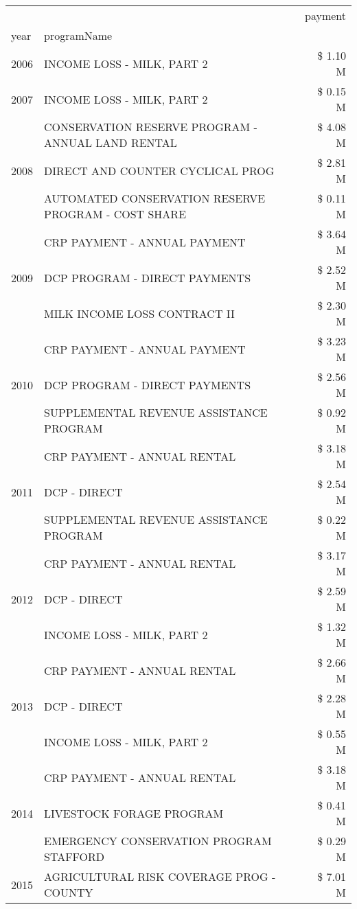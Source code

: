 \begin{tabular}{llr}
\toprule
 &  & payment \\
year & programName &  \\
\midrule
2006 & INCOME LOSS - MILK, PART 2 & \$ 1.10 M \\
\cline{1-3}
2007 & INCOME LOSS - MILK, PART 2 & \$ 0.15 M \\
\cline{1-3}
\multirow[t]{3}{*}{2008} & CONSERVATION RESERVE PROGRAM - ANNUAL LAND RENTAL & \$ 4.08 M \\
 & DIRECT AND COUNTER CYCLICAL PROG & \$ 2.81 M \\
 & AUTOMATED CONSERVATION RESERVE PROGRAM - COST SHARE & \$ 0.11 M \\
\cline{1-3}
\multirow[t]{3}{*}{2009} & CRP PAYMENT - ANNUAL PAYMENT & \$ 3.64 M \\
 & DCP PROGRAM - DIRECT PAYMENTS & \$ 2.52 M \\
 & MILK INCOME LOSS CONTRACT II & \$ 2.30 M \\
\cline{1-3}
\multirow[t]{3}{*}{2010} & CRP PAYMENT - ANNUAL PAYMENT & \$ 3.23 M \\
 & DCP PROGRAM - DIRECT PAYMENTS & \$ 2.56 M \\
 & SUPPLEMENTAL REVENUE ASSISTANCE PROGRAM & \$ 0.92 M \\
\cline{1-3}
\multirow[t]{3}{*}{2011} & CRP PAYMENT - ANNUAL RENTAL & \$ 3.18 M \\
 & DCP - DIRECT & \$ 2.54 M \\
 & SUPPLEMENTAL REVENUE ASSISTANCE PROGRAM & \$ 0.22 M \\
\cline{1-3}
\multirow[t]{3}{*}{2012} & CRP PAYMENT - ANNUAL RENTAL & \$ 3.17 M \\
 & DCP - DIRECT & \$ 2.59 M \\
 & INCOME LOSS - MILK, PART 2 & \$ 1.32 M \\
\cline{1-3}
\multirow[t]{3}{*}{2013} & CRP PAYMENT - ANNUAL RENTAL & \$ 2.66 M \\
 & DCP - DIRECT & \$ 2.28 M \\
 & INCOME LOSS - MILK, PART 2 & \$ 0.55 M \\
\cline{1-3}
\multirow[t]{3}{*}{2014} & CRP PAYMENT - ANNUAL RENTAL & \$ 3.18 M \\
 & LIVESTOCK FORAGE PROGRAM & \$ 0.41 M \\
 & EMERGENCY CONSERVATION PROGRAM STAFFORD & \$ 0.29 M \\
\cline{1-3}
\multirow[t]{3}{*}{2015} & AGRICULTURAL RISK COVERAGE PROG - COUNTY & \$ 7.01 M \\

\end{tabular}
